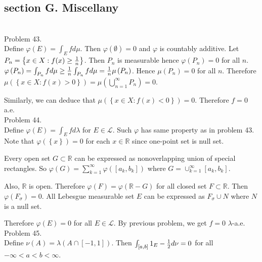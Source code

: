 \subsection*{section G. Miscellany} \hfill \\

Problem 43. \\

Define $\varphi\left( E \right) = \int_E f d\mu$. Then $\varphi(\emptyset) = 0$ and $\varphi$ is countably additive. Let $P_n = \left\{ x\in X : f(x) \geq {1\over n} \right\}$. Then $P_n$ is measurable hence $\varphi\left( P_n \right) = 0$ for all $n$. $\varphi\left( P_n \right) = \int_{P_n} f d\mu \geq {1\over n} \int_{P_n} f d\mu = {1\over n} \mu\left( P_n \right)$. Hence $\mu\left( P_n \right) = 0$ for all $n$.
Therefore $\mu\left( \left\{ x\in X : f(x) > 0 \right\} \right) = \mu\left( \bigcup_{n=1}^{\infty}P_n \right) = 0$.

Similarly, we can deduce that $\mu\left( \left\{ x\in X : f(x) < 0 \right\} \right) = 0$. Therefore $f = 0$ a.e. \\

Problem 44. \\

Define $\varphi\left( E \right) = \int_{E} f d\lambda$ for $E \in \mathcal{L}$. Such $\varphi$ has same property as in problem 43. Note that $\varphi\left( \left\{ x \right\} \right) = 0$ for each $x \in \mathbb{R}$ since one-point set is null set.

Every open set $G \subset \mathbb{R}$ can be expressed as nonoverlapping union of special rectangles. So $\varphi\left( G \right) = \sum_{k=1}^{\infty} \varphi\left( \left[ a_k, b_k \right] \right)$ where $G = \cup_{k=1}^{\infty}\left[ a_k, b_k \right]$.

Also, $\mathbb{R}$ is open. Therefore $\varphi\left( F \right) = \varphi\left( \mathbb{R} - G \right)$ for all closed set $F\subset \mathbb{R}$. Then $\varphi\left( F_{\sigma} \right) = 0$. All Lebesgue measurable set $E$ can be expressed as $F_{\sigma} \cup N$ where $N$ is a null set.

Therefore $\varphi\left( E \right) = 0$ for all $E \in \mathcal{L}$. By previous problem, we get $f = 0$ $\lambda$-a.e. \\

Problem 45. \\

Define $\nu(A) = \lambda \left ( A \cap \left[ -1, 1 \right] \right )$. Then $\int_{\left[ a, b \right]}1_E - {1 \over 2} d\nu = 0$ for all $-\infty < a < b < \infty$.

